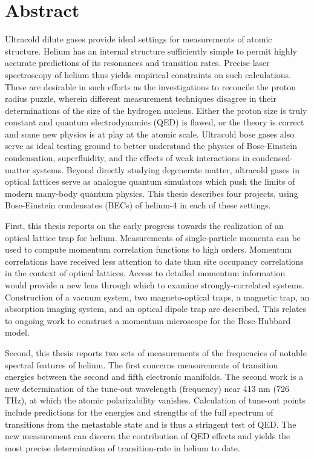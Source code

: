 \section*{Abstract}
Ultracold dilute gases provide ideal settings for measurements of atomic structure. 
Helium has an internal structure sufficiently simple to permit highly accurate predictions of its resonances and transition rates.
Precise laser spectroscopy of helium thus yields empirical constraints on such calculations.
These are desirable in such efforts as the investigations to reconcile the proton radius puzzle, wherein different measurement techniques disagree in their determinations of the size of the hydrogen nucleus.
Either the proton size is truly constant and quantum electrodynamics (QED) is flawed, or the theory is correct and some new physics is at play at the atomic scale.
Ultracold bose gases also serve as ideal testing ground to better understand the physics of Bose-Einstein condensation, superfluidity, and the effects of weak interactions in condensed-matter systems.
Beyond directly studying degenerate matter, ultracold gases in optical lattices serve as analogue quantum simulators which push the limits of modern many-body quantum physics. 
This thesis describes four projects, using Bose-Einstein condensates (BECs) of helium-4 in each of these settings.

First, this thesis reports on the early progress towards the realization of an optical lattice trap for helium.
Measurements of single-particle momenta can be used to compute momentum correlation functions to high orders.
Momentum correlations have received less attention to date than site occupancy correlations in the context of optical lattices.
Access to detailed momentum information would provide a new lens through which to examine strongly-correlated systems.
Construction of a vacuum system, two magneto-optical traps, a magnetic trap, an absorption imaging system, and an optical dipole trap are described.
This relates to ongoing work to construct a momentum microscope for the Bose-Hubbard model.

Second, this thesis reports two sets of measurements of the frequencies of notable spectral features of helium.
The first concerns measurements of transition energies between the second and fifth electronic manifolds.
The second work is a new determination of the tune-out wavelength (frequency) near 413 nm (726 THz), at which the atomic polarizability vanishes. 
Calculation of tune-out points include predictions for the energies and strengths of the full spectrum of transitions from the metastable state and is thus a stringent test of QED.
The new measurement can discern the contribution of QED effects and yields the most precise determination of transition-rate in helium to date.

